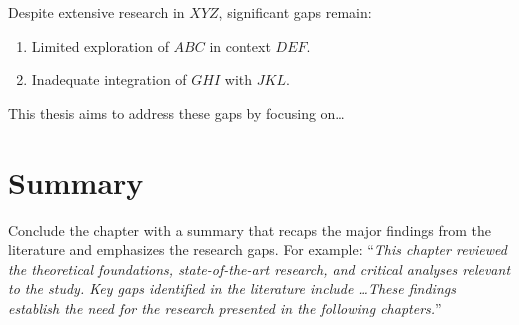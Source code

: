 Despite extensive research in $XYZ$, significant gaps remain:
\begin{enumerate}
    \item Limited exploration of $ABC$ in context $DEF$.
    \item Inadequate integration of $GHI$ with $JKL$.
\end{enumerate}

This thesis aims to address these gaps by focusing on\dots

\section{Summary}\label{sec:review-summary}
Conclude the chapter with a summary that recaps the major findings from the literature and emphasizes the research gaps. For example: ``\textit{This chapter reviewed the theoretical foundations, state-of-the-art research, and critical analyses relevant to the study. Key gaps identified in the literature include \dots These findings establish the need for the research presented in the following chapters.}''
